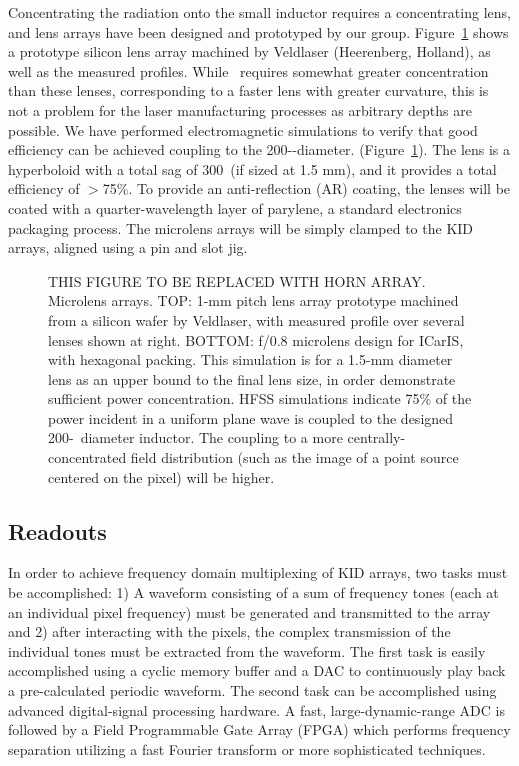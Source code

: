 \vspace{0.05in}{\bf Silicon microlens array.}  Concentrating the radiation onto the small inductor requires a concentrating lens, and lens arrays have been designed and prototyped by our group.   Figure~\ref{fig:lenses} shows a prototype silicon lens array machined by Veldlaser (Heerenberg, Holland), as well as the measured profiles.   While \icaris\ requires somewhat greater concentration than these lenses, corresponding to a faster lens with greater curvature, this is not a problem for the laser manufacturing processes as arbitrary depths are possible.  We have performed electromagnetic simulations to verify that good efficiency can be achieved coupling to the 200-\mum-diameter. (Figure~\ref{fig:lenses}).   The lens is a hyperboloid with a total sag of 300~\mum (if sized at 1.5 mm), and it provides a total efficiency of $>$75\%.  To provide an anti-reflection (AR) coating, the lenses will be coated with a quarter-wavelength layer of parylene, a standard electronics packaging process.  The microlens arrays will be simply clamped to the KID arrays, aligned using a pin and slot jig.

\begin{figure}[t!]
\begin{center}
\captionbaseline\caption{\small THIS FIGURE TO BE REPLACED WITH HORN ARRAY.  Microlens arrays. TOP: 1-mm pitch lens array prototype machined from a silicon wafer by Veldlaser, with measured profile over several lenses shown at right.  BOTTOM:  f/0.8 microlens design for ICarIS, with hexagonal packing.  This simulation is for a 1.5-mm diameter lens as an upper bound to the final lens size, in order demonstrate sufficient power concentration.  HFSS simulations indicate 75\% of the power incident in a uniform plane wave is coupled to the designed 200-\mum\ diameter inductor.  The coupling to a more centrally-concentrated field distribution (such as the image of a point source centered on the pixel) will be higher. }
\linefig\vspace{-0.35in} \label{fig:lenses}
\end{center}
\end{figure}


\subsection{Readouts}
\label{sec:Readouts}

In order to achieve frequency domain multiplexing of KID arrays, two tasks must be accomplished: 1) A waveform consisting of a sum of frequency tones (each at an individual pixel frequency) must be generated and transmitted to the array and 2) after interacting with the pixels, the complex transmission of the individual tones must be extracted from the waveform.  The first task is easily accomplished using a cyclic memory buffer and a DAC to continuously play back a pre-calculated periodic waveform.  The second task can be accomplished using advanced digital-signal processing hardware.  A fast, large-dynamic-range ADC is followed by a Field Programmable Gate Array (FPGA) which performs frequency separation utilizing a fast Fourier transform or more sophisticated techniques.  

